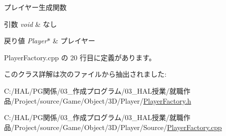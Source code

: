 プレイヤー生成関数 


\begin{DoxyParams}{引数}
{\em void} & なし \\
\hline
\end{DoxyParams}

\begin{DoxyRetVals}{戻り値}
{\em Player$\ast$} & プレイヤー \\
\hline
\end{DoxyRetVals}


 Player\+Factory.\+cpp の 20 行目に定義があります。



このクラス詳解は次のファイルから抽出されました\+:\begin{DoxyCompactItemize}
\item 
C\+:/\+H\+A\+L/\+P\+G関係/03\+\_\+作成プログラム/03\+\_\+\+H\+A\+L授業/就職作品/\+Project/source/\+Game/\+Object/3\+D/\+Player/\mbox{\hyperlink{_player_factory_8h}{Player\+Factory.\+h}}\item 
C\+:/\+H\+A\+L/\+P\+G関係/03\+\_\+作成プログラム/03\+\_\+\+H\+A\+L授業/就職作品/\+Project/source/\+Game/\+Object/3\+D/\+Player/\+Source/\mbox{\hyperlink{_player_factory_8cpp}{Player\+Factory.\+cpp}}\end{DoxyCompactItemize}
